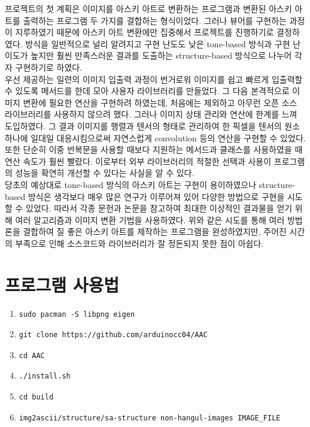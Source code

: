 \documentclass[conference]{IEEEtran}
\begin{document}
프로젝트의 첫 계획은 이미지를 아스키 아트로 변환하는 프로그램과 변환된 아스키 아트를 출력하는 프로그램 두 가지를 결합하는 형식이었다.
그러나  뷰어를 구현하는 과정이 지루하였기 때문에 아스키 아트 변환에만 집중해서 프로젝트를 진행하기로 결정하였다.
방식을 일반적으로 널리 알려지고 구현 난도도 낮은 tone-based 방식과 구현 난이도가 높지만 훨씬 만족스러운 결과를 도출하는 structure-based 방식으로 나누어 각자 구현하기로 하였다. \\
\indent 우선  제공하는 일련의 이미지 입출력 과정이 번거로워 이미지를 쉽고 빠르게 입출력할 수 있도록  메서드를 한데 모아 사용자 라이브러리를 만들었다.
그 다음 본격적으로 이미지 변환에 필요한 연산을 구현하려 하였는데, 처음에는  제외하고 아무런 오픈 소스 라이브러리를 사용하지 않으려 했다.
그러나  이미지 상태 관리와 연산에 한계를 느껴  도입하였다.
그 결과 이미지를 행렬과 텐서의 형태로 관리하여 한 픽셀을 텐서의 원소 하나에 일대일 대응시킴으로써 자연스럽게 convolution 등의 연산을 구현할 수 있었다.
또한 단순히 이중 반복문을 사용할 때보다  지원하는 메서드과 클래스를 사용하였을 때 연산 속도가 훨씬 빨랐다.
이로부터 외부 라이브러리의 적절한 선택과 사용이 프로그램의 성능을 확연히 개선할 수 있다는 사실을 알 수 있다. \\
\indent 당초의 예상대로 tone-based 방식의 아스키 아트는 구현이 용이하였으나 structure-based 방식은 생각보다 매우 많은 연구가 이루어져 있어 다양한 방법으로 구현을 시도할 수 있었다.
따라서 각종 문헌과 논문을 참고하여 최대한 이상적인 결과물을 얻기 위해 여러 알고리즘과 이미지 변환 기법을 사용하였다.
위와 같은 시도를 통해 여러 방법론을 결합하여 질 좋은 아스키 아트를 제작하는 프로그램을 완성하였지만, 주어진 시간의 부족으로 인해 소스코드와 라이브러리가 잘 정돈되지 못한 점이 아쉽다.

\section{프로그램 사용법}
\begin{enumerate}
\item \begin{verbatim}sudo pacman -S libpng eigen\end{verbatim}
\item \begin{verbatim}git clone https://github.com/arduinocc04/AAC\end{verbatim}
\item \begin{verbatim}cd AAC\end{verbatim}
\item \begin{verbatim}./install.sh\end{verbatim}
\item \begin{verbatim}cd build \end{verbatim}
\item \begin{verbatim}img2ascii/structure/sa-structure non-hangul-images IMAGE_FILE\end{verbatim}
\end{enumerate}
\end{document}
